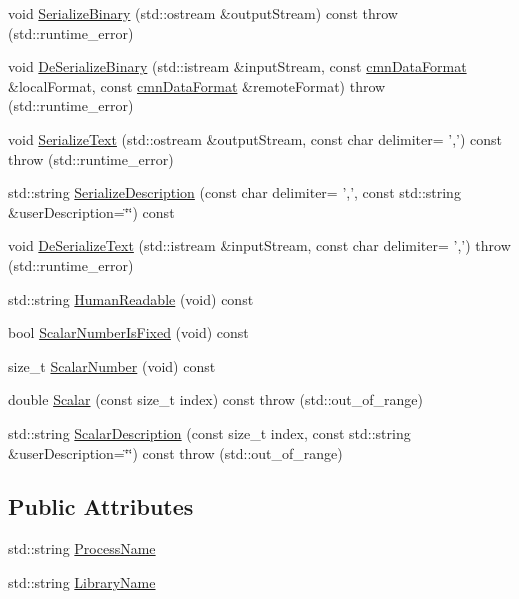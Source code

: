 \begin{DoxyCompactItemize}
\item 
void \hyperlink{classmts_description_load_library_a36dcc975e60f33c145d5b52ea9ff87b2}{Serialize\-Binary} (std\-::ostream \&output\-Stream) const   throw (std\-::runtime\-\_\-error)
\item 
void \hyperlink{classmts_description_load_library_ac2c7b8d69f01b082c9237fe7d263a09c}{De\-Serialize\-Binary} (std\-::istream \&input\-Stream, const \hyperlink{classcmn_data_format}{cmn\-Data\-Format} \&local\-Format, const \hyperlink{classcmn_data_format}{cmn\-Data\-Format} \&remote\-Format)  throw (std\-::runtime\-\_\-error)
\item 
void \hyperlink{classmts_description_load_library_abaf176264e242024c9e5e4f86e45f25f}{Serialize\-Text} (std\-::ostream \&output\-Stream, const char delimiter= ',') const   throw (std\-::runtime\-\_\-error)
\item 
std\-::string \hyperlink{classmts_description_load_library_ae3c7d2b8bf0c93e9ec8cf69b7e6a08f6}{Serialize\-Description} (const char delimiter= ',', const std\-::string \&user\-Description=\char`\"{}\char`\"{}) const 
\item 
void \hyperlink{classmts_description_load_library_abf2adbff4c26ef5bd4ca6b465a7d1de0}{De\-Serialize\-Text} (std\-::istream \&input\-Stream, const char delimiter= ',')  throw (std\-::runtime\-\_\-error)
\item 
std\-::string \hyperlink{classmts_description_load_library_a5efd4a98f1420d041653f1043b0d479d}{Human\-Readable} (void) const 
\item 
bool \hyperlink{classmts_description_load_library_ad3df9d64a2870b49962d0f2b1f50b0c5}{Scalar\-Number\-Is\-Fixed} (void) const 
\item 
size\-\_\-t \hyperlink{classmts_description_load_library_ac5a7a1b53e0d614e753a8e3fa0727039}{Scalar\-Number} (void) const 
\item 
double \hyperlink{classmts_description_load_library_a65d1290e22d59b527ab893542e3ea44c}{Scalar} (const size\-\_\-t index) const   throw (std\-::out\-\_\-of\-\_\-range)
\item 
std\-::string \hyperlink{classmts_description_load_library_a74b15cf6ac15daa53f84ce130ad63397}{Scalar\-Description} (const size\-\_\-t index, const std\-::string \&user\-Description=\char`\"{}\char`\"{}) const   throw (std\-::out\-\_\-of\-\_\-range)
\end{DoxyCompactItemize}
\subsection*{Public Attributes}
\begin{DoxyCompactItemize}
\item 
std\-::string \hyperlink{classmts_description_load_library_a4632a3ec13b1887b43383d2ee1e4c18f}{Process\-Name}
\item 
std\-::string \hyperlink{classmts_description_load_library_aaefed2ef09ccb43bf153e813ab022167}{Library\-Name}
\end{DoxyCompactItemize}


